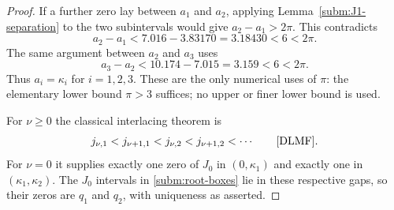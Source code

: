 \documentclass[11pt]{article}
\theoremstyle{remark}
\begin{document}
\begin{proof}
If a further zero lay between $a_1$ and $a_2$, applying
Lemma~\ref{subm:J1-separation} to the two subintervals would give
$a_2-a_1>2\pi$.  This contradicts
\[
 a_2-a_1<7.016-3.83170=3.18430<6<2\pi.
\]
The same argument between $a_2$ and $a_3$ uses
\[
 a_3-a_2<10.174-7.015=3.159<6<2\pi.
\]
Thus $a_i=\kappa_i$ for $i=1,2,3$.  These are the only numerical
uses of $\pi$: the elementary lower bound $\pi>3$ suffices; no
upper or finer lower bound is used.

For $\nu\ge0$ the classical interlacing theorem is
\[
 j_{\nu,1}<j_{\nu+1,1}<j_{\nu,2}<j_{\nu+1,2}<\cdots
 \qquad\text{\cite[Eq.~10.21.2]{DLMF}}.
\]
For $\nu=0$ it supplies exactly one zero of $J_0$ in
$(0,\kappa_1)$ and exactly one in $(\kappa_1,\kappa_2)$.
The $J_0$ intervals in \eqref{subm:root-boxes} lie in these respective
gaps, so their zeros are $q_1$ and $q_2$, with uniqueness as asserted.
\end{proof}
\end{document}
